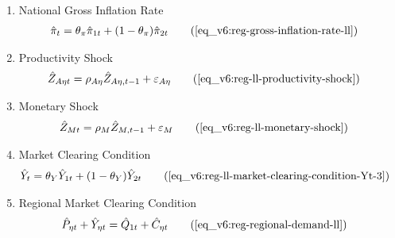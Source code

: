\documentclass[../thesis.tex]{subfiles}
\begin{document}
{\begin{itemize}
\begin{enumerate}
		\item National Gross Inflation Rate
		\begin{align}
			\hat{\pi}_{t} &= \theta_{\pi} \hat{\pi}_{1t} + (1 - \theta_{\pi}) \hat{\pi}_{2t} \tag{\ref{eq_v6:reg-gross-inflation-rate-ll}}
		\end{align}
		
		\item Productivity Shock
		\begin{alignat}{2}
			\hat{Z}_{A\eta t} &= \rho_{A\eta} \hat{Z}_{A\eta, t-1} + \varepsilon_{A\eta} \tag{\ref{eq_v6:reg-ll-productivity-shock}}
		\end{alignat}
		
		\item Monetary Shock
		\begin{alignat}{2}
			\hat{Z}_{Mt} &= \rho_M \hat{Z}_{M,t-1} + \varepsilon_{M} \tag{\ref{eq_v6:reg-ll-monetary-shock}}
		\end{alignat}
		
		\item Market Clearing Condition
		\begin{align}
			\hat{Y}_{t} &= \theta_{Y} \hat{Y}_{1t} + (1-\theta_{Y}) \hat{Y}_{2t} \tag{\ref{eq_v6:reg-ll-market-clearing-condition-Yt-3}}
		\end{align}
		
		\item Regional Market Clearing Condition
		\begin{align}
			\hat{P}_{\eta t} + \hat{Y}_{\eta t} &= \hat{Q}_{1t} + \hat{C}_{\eta t} \tag{\ref{eq_v6:reg-regional-demand-ll}}
		\end{align}
		
	\end{enumerate}
	
\end{itemize}

} %

\newpage
\end{document}
